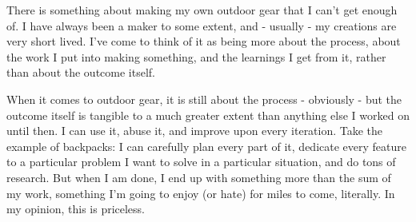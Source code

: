 There is something about making my own outdoor gear that I can't get enough of. I have always been a maker to some extent, and - usually - my creations are very short lived. I've come to think of it as being more about the process, about the work I put into making something, and the learnings I get from it, rather than about the outcome itself.

When it comes to outdoor gear, it is still about the process - obviously - but the outcome itself is tangible to a much greater extent than anything else I worked on until then. I can use it, abuse it, and improve upon every iteration. Take the example of backpacks: I can carefully plan every part of it, dedicate every feature to a particular problem I want to solve in a particular situation, and do tons of research. But when I am done, I end up with something more than the sum of my work, something I'm going to enjoy (or hate) for miles to come, literally. In my opinion, this is priceless.
